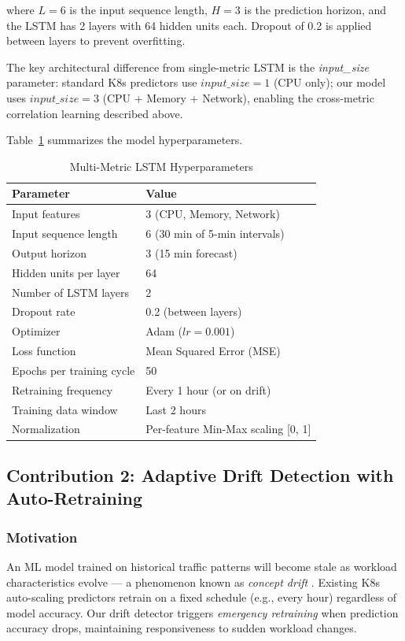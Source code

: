 \documentclass[journal]{IEEEtran}
\begin{document}
where $L=6$ is the input sequence length, $H=3$ is the prediction horizon, and the LSTM has 2 layers with 64 hidden units each. Dropout of 0.2 is applied between layers to prevent overfitting.

The key architectural difference from single-metric LSTM is the \textit{input\_size} parameter: standard K8s predictors use $input\_size=1$ (CPU only); our model uses $input\_size=3$ (CPU + Memory + Network), enabling the cross-metric correlation learning described above.

Table~\ref{tab:lstm} summarizes the model hyperparameters.

\begin{table}[h]
\centering
\caption{Multi-Metric LSTM Hyperparameters}
\label{tab:lstm}
\begin{tabular}{@{}ll@{}}
\toprule
\textbf{Parameter} & \textbf{Value} \\
\midrule
Input features & 3 (CPU, Memory, Network) \\
Input sequence length & 6 (30 min of 5-min intervals) \\
Output horizon & 3 (15 min forecast) \\
Hidden units per layer & 64 \\
Number of LSTM layers & 2 \\
Dropout rate & 0.2 (between layers) \\
Optimizer & Adam ($lr = 0.001$) \\
Loss function & Mean Squared Error (MSE) \\
Epochs per training cycle & 50 \\
Retraining frequency & Every 1 hour (or on drift) \\
Training data window & Last 2 hours \\
Normalization & Per-feature Min-Max scaling [0, 1] \\
\bottomrule
\end{tabular}
\end{table}

\subsection{Contribution 2: Adaptive Drift Detection with Auto-Retraining}
\label{sec:drift}

\subsubsection{Motivation}
An ML model trained on historical traffic patterns will become stale as workload characteristics evolve --- a phenomenon known as \textit{concept drift} \cite{gama2014}. Existing K8s auto-scaling predictors retrain on a fixed schedule (e.g., every hour) regardless of model accuracy. Our drift detector triggers \textit{emergency retraining} when prediction accuracy drops, maintaining responsiveness to sudden workload changes.
\end{document}
